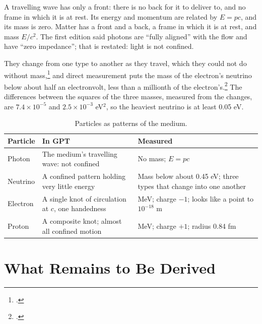 \documentclass[11pt,a4paper]{article}
\newcommand{\fn}[1]{\footnote{\citealp{#1}.}}
\begin{document}
 A travelling wave has only a front: there is no back for it to deliver to, and no frame in which it is at rest. Its energy and momentum are related by $E = pc$, and its mass is zero. Matter has a front and a back, a frame in which it is at rest, and mass $E/c^2$. The first edition said photons are ``fully aligned'' with the flow and have ``zero impedance''; that is restated: light is not confined.

 They change from one type to another as they travel, which they could not do without mass,\fn{fukuda1998} and direct measurement puts the mass of the electron's neutrino below about half an electronvolt, less than a millionth of the electron's.\fn{katrin2025} The differences between the squares of the three masses, measured from the changes, are $7.4\times10^{-5}$ and $2.5\times10^{-3}$ eV$^2$, so the heaviest neutrino is at least 0.05 eV. 

\begin{table}[H]
\centering
\small
\renewcommand{\arraystretch}{1.25}
\begin{tabular}{@{}>{\raggedright\arraybackslash}p{}>{\raggedright\arraybackslash}p{}>{\raggedright\arraybackslash}p{}@{}}
\toprule
\textbf{Particle} & \textbf{In GPT} & \textbf{Measured} \\
\midrule
Photon & The medium's travelling wave: not confined & No mass; $E = pc$ \\
Neutrino & A confined pattern holding very little energy & Mass below about 0.45 eV; three types that change into one another \\
Electron & A single knot of circulation at $c$, one handedness & 0.511 MeV; charge $-1$; looks like a point to $10^{-18}$ m \\
Proton & A composite knot; almost all confined motion & 938 MeV; charge $+1$; radius 0.84 fm \\
\bottomrule
\end{tabular}
\caption{Particles as patterns of the medium. \hyptag}
\label{tab:particles}
\end{table}

\section{What Remains to Be Derived}
\label{sec:owed}
\end{document}
